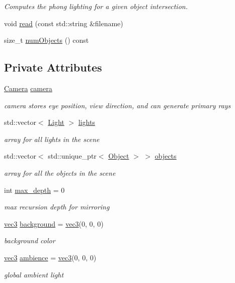 \begin{DoxyCompactItemize}
\begin{DoxyCompactList}\small\item\em Computes the phong lighting for a given object intersection. \end{DoxyCompactList}\item 
void \hyperlink{classScene_a15d828d5f43ff11466712b9203082316}{read} (const std\+::string \&filename)
\item 
size\+\_\+t \hyperlink{classScene_a27b9b9e915a87fd7736dd82d71da372a}{num\+Objects} () const 
\end{DoxyCompactItemize}
\subsection*{Private Attributes}
\begin{DoxyCompactItemize}
\item 
\hyperlink{classCamera}{Camera} \hyperlink{classScene_afed13ec4ba2d7ab75b273d507911b498}{camera}
\begin{DoxyCompactList}\small\item\em camera stores eye position, view direction, and can generate primary rays \end{DoxyCompactList}\item 
std\+::vector$<$ \hyperlink{structLight}{Light} $>$ \hyperlink{classScene_ab3625e4ac3c6e47156edd23e2421e828}{lights}
\begin{DoxyCompactList}\small\item\em array for all lights in the scene \end{DoxyCompactList}\item 
std\+::vector$<$ std\+::unique\+\_\+ptr$<$ \hyperlink{structObject}{Object} $>$ $>$ \hyperlink{classScene_abbd6f5b3a4639c3b089037519085bf86}{objects}
\begin{DoxyCompactList}\small\item\em array for all the objects in the scene \end{DoxyCompactList}\item 
int \hyperlink{classScene_a9150039f4d2c46a617b51c7920142d52}{max\+\_\+depth} = 0
\begin{DoxyCompactList}\small\item\em max recursion depth for mirroring \end{DoxyCompactList}\item 
\hyperlink{classvec3}{vec3} \hyperlink{classScene_ab2f20cf753edf2f92fec9b1ad7c9b93e}{background} = \hyperlink{classvec3}{vec3}(0, 0, 0)
\begin{DoxyCompactList}\small\item\em background color \end{DoxyCompactList}\item 
\hyperlink{classvec3}{vec3} \hyperlink{classScene_a8809b5fcac40d60ab499e90f8ae592b3}{ambience} = \hyperlink{classvec3}{vec3}(0, 0, 0)
\begin{DoxyCompactList}\small\item\em global ambient light \end{DoxyCompactList}\end{DoxyCompactItemize}



